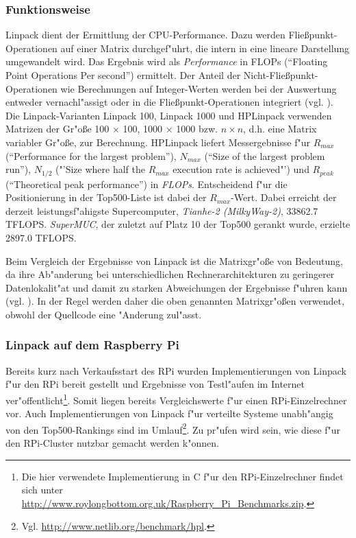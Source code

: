 
\subsubsection{Funktionsweise}\label{Funktionsweise Linpack}

Linpack dient der Ermittlung der CPU-Performance. Dazu werden Flie\ss punkt-Operationen auf einer Matrix durchgef"uhrt, die intern in eine lineare Darstellung umgewandelt wird. Das Ergebnis wird als \textit{Performance} in FLOPs ("`Floating Point Operations Per second"') ermittelt. Der Anteil der Nicht-Flie\ss punkt-Operationen wie Berechnungen auf Integer-Werten werden bei der Auswertung entweder vernachl"assigt oder in die Flie\ss punkt-Operationen integriert (vgl. \cite{wei90}). Die Linpack-Varianten Linpack 100, Linpack 1000 und HPLinpack verwenden Matrizen der Gr"o\ss e 100 $\times$ 100, 1000 $\times$ 1000 bzw. $n\times n$, d.h. eine Matrix variabler Gr"o\ss e, zur Berechnung. HPLinpack liefert Messergebnisse f"ur $R_{max}$ ("`Performance for the largest problem"'), $N_{max}$ ("`Size of the largest problem run"'), $N_{1/2}$ ("'Size where half the $R_{max}$ execution rate is achieved"') und $R_{peak}$ ("`Theoretical peak performance"') in \textit{FLOPs}. Entscheidend f"ur die Positionierung in der Top500-Liste ist dabei der $R_{max}$-Wert. Dabei erreicht der derzeit leistungsf"ahigste Supercomputer, \textit{Tianhe-2 (Milky\-Way-2)}, 33862.7 TFLOPS. \textit{SuperMUC}, der zuletzt auf Platz 10 der Top500 gerankt wurde, erzielte 2897.0 TFLOPS.

Beim Vergleich der Ergebnisse von Linpack ist die Matrixgr"o\ss e von Bedeutung, da ihre Ab"anderung bei unterschiedlichen Rechnerarchitekturen zu geringerer Datenlokalit"at und damit zu starken Abweichungen der Ergebnisse f"uhren kann (vgl. \cite{wei90}). In der Regel werden daher die oben genannten Matrixgr"o\ss en verwendet, obwohl der Quellcode eine "Anderung zul"asst. 

\subsubsection{Linpack auf dem Raspberry Pi}\label{Linpack RPi}

Bereits kurz nach Verkaufsstart des RPi wurden Implementierungen von Linpack f"ur den RPi bereit gestellt und Ergebnisse von Testl"aufen im Internet ver"offentlicht\footnote{Die hier verwendete Implementierung in C f"ur den RPi-Einzelrechner findet sich unter \url{http://www.roylongbottom.org.uk/Raspberry_Pi_Benchmarks.zip}.}. Somit liegen bereits Vergleichswerte f"ur einen RPi-Einzelrechner vor. Auch Implementierungen von Linpack f"ur verteilte Systeme unabh"angig von den Top500-Rankings sind im Umlauf\footnote{Vgl. \url{http://www.netlib.org/benchmark/hpl}.}. Zu pr"ufen wird sein, wie diese f"ur den RPi-Cluster nutzbar gemacht werden k"onnen. 

